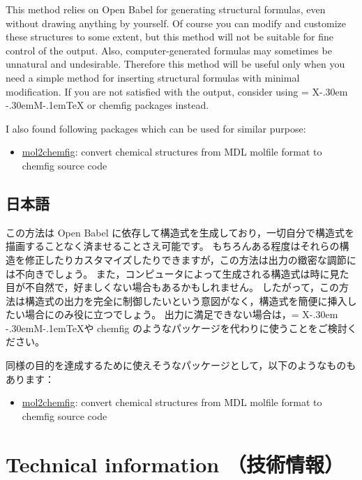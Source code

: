 \documentclass[12pt]{jsarticle}
\def\XyM{\ifnum\fam=-1\relax\fam=0\relax\fi\TestCount=\fam%
X\kern-.30em\smash{\raise.50ex\hbox{$\fam\TestCount\Upsilon$}}%
\kern-.30em{M}}
\def\XyMTeX{\XyM\kern-.1em\TeX}
\begin{document}
This method relies on Open Babel for generating structural formulas, even without drawing anything by yourself.
Of course you can modify and customize these structures to some extent, but this method will not be suitable for fine control of the output.
Also, computer-generated formulas may sometimes be unnatural and undesirable.
Therefore this method will be useful only when you need a simple method for inserting structural formulas with minimal modification.
If you are not satisfied with the output, consider using {\XyMTeX} or \textsf{chemfig} packages instead.

I also found following packages which can be used for similar purpose:
\begin{itemize}
\item \href{http://www.ctan.org/pkg/mol2chemfig}{\textsf{mol2chemfig}}: convert chemical structures from MDL molfile format to \textsf{chemfig} source code
\end{itemize}

\subsection{日本語}

この方法は Open Babel に依存して構造式を生成しており，一切自分で構造式を描画することなく済ませることさえ可能です。
もちろんある程度はそれらの構造を修正したりカスタマイズしたりできますが，この方法は出力の緻密な調節には不向きでしょう。
また，コンピュータによって生成される構造式は時に見た目が不自然で，好ましくない場合もあるかもしれません。
したがって，この方法は構造式の出力を完全に制御したいという意図がなく，構造式を簡便に挿入したい場合にのみ役に立つでしょう。
出力に満足できない場合は，\XyMTeX や \textsf{chemfig} のようなパッケージを代わりに使うことをご検討ください。

同様の目的を達成するために使えそうなパッケージとして，以下のようなものもあります：
\begin{itemize}
\item \href{http://www.ctan.org/pkg/mol2chemfig}{\textsf{mol2chemfig}}: convert chemical structures from MDL molfile format to \textsf{chemfig} source code
\end{itemize}

\clearpage

\section{Technical information （技術情報）} \label{detail}
\end{document}
